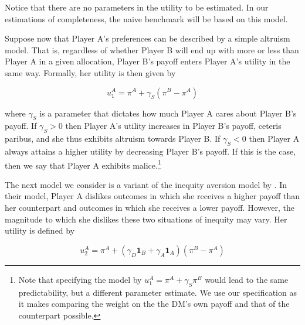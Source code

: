 \documentclass[11pt,a4paper]{article}
\theoremstyle{definition}
\begin{document}
Notice that there are no parameters in the utility to be estimated. In our estimations of completeness, the naive benchmark will be based on this model.

Suppose now that Player A's preferences can be described by a simple altruism model. That is, regardless of whether Player B will end up with more or less than Player A in a given allocation, Player B's payoff enters Player A's utility in the same way. Formally, her utility is then given by

\begin{equation}
\label{eq:simple_altruism}
u^{A}_1=\pi^{A}+\gamma_S(\pi^{B}-\pi^A)
\end{equation}

where \(\gamma_S\) is a parameter that dictates how much Player A cares about Player B's payoff. If \(\gamma_S>0\) then Player A's utility increases in Player B's payoff, ceteris paribus, and she thus exhibits altruism towards Player B. If \(\gamma_S<0\) then Player A always attains a higher utility by decreasing Player B's payoff. If this is the case, then we say that Player A exhibits malice.\footnote{Note that specifying the model by \(u^{A}_1=\pi^{A}+\gamma_S \pi^{B}\) would lead to the same predictability, but a different parameter estimate. We use our specification as it makes comparing the weight on the the DM's own payoff and that of the counterpart possible.}

The next model we consider is a variant of the inequity aversion model by \citet{Fehr1999}. In their model, Player A dislikes outcomes in which she receives a higher payoff than her counterpart and outcomes in which she receives a lower payoff. However, the magnitude to which she dislikes these two situations of inequity may vary.  Her utility is defined by

\begin{equation}
\label{eq:inequity_aversion}
u^{A}_2=\pi^A + (\gamma_D \mathbf{1}_B + \gamma_A \mathbf{1}_A)(\pi^B-\pi^A)
\end{equation}
\end{document}
